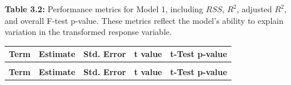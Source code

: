 \documentclass[
]{article}
\begin{document}
\textbf{Table 3.2:} Performance metrics for Model 1, including \(RSS\),
\(R^2\), adjusted \(R^2\), and overall F-test p-value. These metrics
reflect the model's ability to explain variation in the transformed
response variable.

\newpage

\begingroup\fontsize{10}{12}\selectfont

\begin{longtable}[t]{>{\raggedright\arraybackslash}m{4.5cm}rrrr}
\toprule
\textbf{Term} & \textbf{Estimate} & \textbf{Std. Error} & \textbf{t value} & \textbf{t-Test p-value}\\
\midrule
\endfirsthead
\multicolumn{5}{@{}l}{\textit{(continued)}}\\
\toprule
\textbf{Term} & \textbf{Estimate} & \textbf{Std. Error} & \textbf{t value} & \textbf{t-Test p-value}\\
\midrule
\endhead


\end{longtable}
\end{document}
